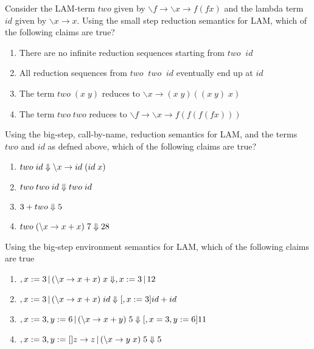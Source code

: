 \documentclass{article}
\begin{document}
 Consider the LAM-term $two$ given by $\backslash f
\rightarrow \backslash x \rightarrow  f (f x)$
and the lambda term $id$ given by $\backslash x \rightarrow x$. Using
the small step reduction semantics for LAM, which of the following claims are true?

\begin{enumerate}
\item There are no infinite reduction sequences starting from $two
  \;\; id$
\item All reduction sequences from $two \;\; two \;\; id$ eventually end up at $id$
\item The term $two \; (x \; y)$ reduces to $\backslash x \rightarrow
  (x \; y) ((x \; y) \; x)$  
\item The term $two \; two$ reduces to $\backslash f \rightarrow  \backslash x \rightarrow f ( f ( f ( f x)))$
\end{enumerate}



 Using the big-step, call-by-name, reduction
semantics for LAM, and the terms $two$ and $id$ as defned above, which
of the following claims are true?

\begin{enumerate}
\item $two \; id \Downarrow \backslash x \rightarrow id \; (id \; x)$
\item $two \; two \; id \Downarrow two \; id$
\item $3 + two \Downarrow 5$
\item $two \; (\backslash x \rightarrow x + x) \; 7 \Downarrow 28$
\end{enumerate}


 Using the big-step environment semantics for
LAM, which of the following claims are true





\begin{enumerate}
\item $,x:=3 \,|\, (\backslash x \rightarrow x + x) \; x \Downarrow ,x:=3 \,|\, 12$
\item $,x:=3 \,|\, (\backslash x \rightarrow x + x) \; id \Downarrow [,x:=3]id + id$
\item $,x:=3, y:=6 \,|\, (\backslash x \rightarrow x + y) \; 5 \Downarrow [,x=3, y:=6] 11$
\item $,x:=3, y:= [] z \rightarrow z \,|\, (\backslash x \rightarrow
    y \; x) \;5 \Downarrow 5$
\end{enumerate}
\end{document}

